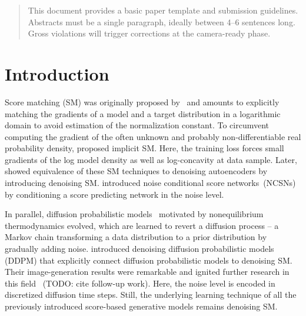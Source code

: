 \documentclass{article}
\theoremstyle{plain}
\theoremstyle{definition}
\theoremstyle{remark}
\begin{document}
\printAffiliationsAndNotice{\icmlEqualContribution} %

\begin{abstract}
This document provides a basic paper template and submission guidelines.
Abstracts must be a single paragraph, ideally between 4--6 sentences long.
Gross violations will trigger corrections at the camera-ready phase.
\end{abstract}




\section{Introduction}


Score matching (SM) was originally proposed by~\citet{Hy05} and amounts to explicitly matching the gradients of a model and a target distribution in a logarithmic domain to avoid estimation of the normalization constant.
To circumvent computing the gradient of the often unknown and probably non-differentiable real probability density, \cite{Hy05} proposed implicit SM.
Here, the training loss forces small gradients of the log model density as well as log-concavity at data sample.
Later, \citet{Vi11} showed equivalence of these SM techniques to denoising autoencoders by introducing denoising SM.
\citet{SoEr19,SoEr20} introduced noise conditional score networks~(NCSNs) by conditioning a score predicting network in the noise level.

In parallel, diffusion probabilistic models~\cite{SoJa15} motivated by nonequilibrium thermodynamics evolved, which are learned to revert a diffusion process -- a Markov chain transforming a data distribution to a prior distribution by gradually adding noise.
\citet{HoJa20} introduced denoising diffusion probabilistic models (DDPM) that explicitly connect diffusion probabilistic models to denoising SM.
Their image-generation results were remarkable and ignited further research in this field~\cite{RoBl22} (TODO: cite follow-up work).
Here, the noise level is encoded in discretized diffusion time steps.
Still, the underlying learning technique of all the previously introduced score-based generative models remains denoising SM.
\end{document}
